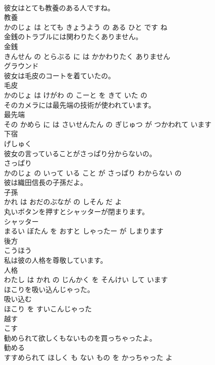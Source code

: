 \documentclass[8pt]{extreport}
\begin{document}
\begin{CJK}{UTF8}{min}
\\	彼女はとても教養のある人ですね。	
\\	教養 
\\	かのじょ は とても きょうよう の ある ひと です ね			
\\	金銭のトラブルには関わりたくありません。	
\\	金銭 
\\	きんせん の とらぶる に は かかわりたく ありません			
\\	グラウンド	
\\	彼女は毛皮のコートを着ていたの。	
\\	毛皮 
\\	かのじょ は けがわ の こーと を きて いた の			
\\	そのカメラには最先端の技術が使われています。	
\\	最先端 
\\	その かめら に は さいせんたん の ぎじゅつ が つかわれて います			
\\	下宿	
\\	げしゅく			
\\	彼女の言っていることがさっぱり分からないの。	
\\	さっぱり 
\\	かのじょ の いって いる こと が さっぱり わからない の			
\\	彼は織田信長の子孫だよ。	
\\	子孫 
\\	かれ は おだのぶなが の しそん だ よ			
\\	丸いボタンを押すとシャッターが閉まります。	
\\	シャッター 
\\	まるい ぼたん を おすと しゃったー が しまります			
\\	後方	
\\	こうほう			
\\	私は彼の人格を尊敬しています。	
\\	人格 
\\	わたし は かれ の じんかく を そんけい して います			
\\	ほこりを吸い込んじゃった。	
\\	吸い込む 
\\	ほこり を すいこんじゃった			
\\	越す	
\\	こす			
\\	勧められて欲しくもないものを買っちゃったよ。	
\\	勧める 
\\	すすめられて ほしく も ない もの を かっちゃった よ			

\end{CJK}
\end{document}
